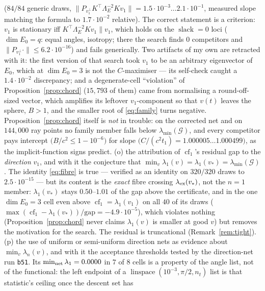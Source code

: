 \documentclass[11pt]{article}
\theoremstyle{remark}
\newcommand{\Gr}{\mathcal{G}}
\newcommand{\Le}{\Lambda_E}
\begin{document}
\begin{enumerate}
($84/84$ generic draws, $\|P_{v_{1}^{\perp}}K^{\top}\Le^{-2}Kv_{1}\|=1.5\cdot10^{-3}\ldots2.1\cdot10^{-1}$,
measured slope matching the formula to $1.7\cdot10^{-2}$ relative). The correct statement is a
criterion: $v_{1}$ is stationary iff $K^{\top}\Le^{-2}Kv_{1}\parallel v_{1}$, which holds on the
$\operatorname{slack}=0$ loci ($\dim E_{0}=q$: equal angles, isotropy; there the search finds
$0$ competitors and $\|P_{v_{1}^{\perp}}\cdot\|\le6.2\cdot10^{-16}$) and fails generically. Two
artifacts of my own are retracted with it: the first version of that search took $v_{1}$ to be an arbitrary
eigenvector of $E_{0}$, which at $\dim E_{0}=3$ is not the $C$-maximiser --- its self-check caught a
$1.4\cdot10^{-2}$ discrepancy; and a degenerate-cell ``violation'' of Proposition~\ref{prop:chord}
($15{,}793$ of them) came from normalising a round-off-sized vector, which amplifies its leftover
$v_{1}$-component so that $v(t)$ leaves the sphere, $B>1$, and the smaller root of
\eqref{eq:family} turns negative. Proposition~\ref{prop:chord} itself is \emph{not} in trouble: on
the corrected net and on $144{,}000$ ray points no family member falls below
$\lambda_{\min}(\Gr)$, and every competitor pays intercept $\bigl(B/c^{2}\le1-10^{-6}\bigr)$ for slope
$\bigl(C/(c^{2}t_{1})=1.000005\ldots1.000499\bigr)$, as the implicit-function signs predict.
(o) the attribution of $\operatorname{cf}_1$'s residual gap to the \emph{direction} $v_1$, and with it
the conjecture that $\min_v\lambda_1(v)=\lambda_1(v_\ast)=\lambda_{\min}(\Gr)$. The identity
\eqref{eq:fibre} is true --- verified as an identity on $320/320$ draws to $2.5\cdot10^{-15}$ --- but
its content is the \emph{exact} fibre crossing $\lambda_{\rm ex}(v_\ast)$, not the $n=1$ member:
$\lambda_1(v_\ast)$ stays $0.50$--$1.01$ of the gap above the certificate, and in the one
$\operatorname{dim}E_0=3$ cell even above $\operatorname{cf}_1=\lambda_1(v_1)$ on all $40$ of its draws
($\max(\operatorname{cf}_1-\lambda_1(v_\ast))/\text{gap}=-4.9\cdot10^{-5}$), which violates nothing (Proposition~\ref{prop:chord} never claims
$\lambda_1(v)$ is smaller at good $v$) but removes the motivation for the search. The residual is
truncational (Remark~\ref{rem:tight}).
(p) the use of uniform or semi-uniform direction nets as evidence about $\min_v\lambda_n(v)$, and with
it the acceptance thresholds tested by the direction-net run \texttt{b51}. Its $\min_{\rm net}\lambda_1=0.0000$ in
$7$ of $8$ cells is a property of the angle list, not of the functional: the left endpoint of a
$\operatorname{linspace}(10^{-3},\pi/2,n_t)$ list is that statistic's ceiling once the descent set has

\end{enumerate}
\end{document}
